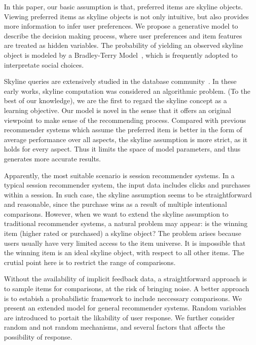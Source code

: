 \documentclass[sigconf]{acmart}
\begin{document}
In this paper, our basic assumption is that, preferred items are skyline objects. Viewing preferred items as skyline objects is not only intuitive, but also provides more information to infer user preferences. We propose a generative model to describe the decision making process, where user preferences and item features are treated as hidden variables. The probability of yielding an observed skyline object is modeled by a Bradley-Terry Model~\cite{Hunter2004MM}, which is frequently adopted to interpretate social choices. 

Skyline queries are extensively studied in the database community~\cite{Pei2007Probabilistic}. In these early works, skyline computation was considered an algorithmic problem. (To the best of our knowledge), we are the first to regard the skyline concept as a learning objective. Our model is novel in the sense that it offers an original viewpoint to make sense of the recommending process. Compared with previous recommender systems which assume the preferred item is better in the form of average performance over all aspects, the skyline assumption is more strict, as it holds for every aspect. Thus it limits the space of model parameters, and thus generates more accurate results. 

Apparently, the most suitable scenario is session recommender systems. In a typical session recommender system, the input data includes clicks and purchases within a session. In such case, the skyline assumption seems to be straightforward and reasonable, since the purchase wins as a result of multiple intentional comparisons. However, when we want to extend the skyline assumption to traditional recommender systems, a natural problem may appear: is the winning item (higher rated or purchased) a skyline object? The problem arises because users usually have very limited access to the item universe. It is impossible that the winning item is an ideal skyline object, with respect to all other items. The crutial point here is to restrict the range of comparisons. 

Without the availability of implicit feedback data, a straightforward approach is to sample items for comparisons, at the risk of bringing noise. A better approach is to estabish a probabilistic framework to include neccessary comparisons. We present an extended model for general recommender systems. Random variables are introduced to portait the likability of user response. We further consider random and not random mechanisms, and several factors that affects the possibility of response.       
\end{document}
